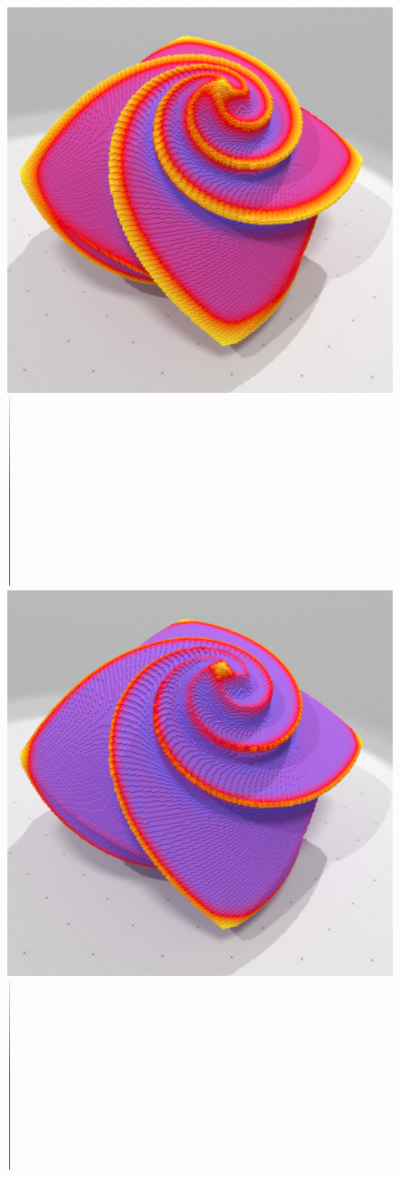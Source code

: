 \begin{figure}[ht]
\begin{center}
  \includegraphics[width=.40\linewidth]{images/Curvature/Octa256_Mean_R_15_0001}
  \includegraphics[width=0.1cm,height=5.5cm]{images/YMTB6W}
  \includegraphics[width=.40\linewidth]{images/Curvature/Octa256_Gauss_R_15_0001}
  \includegraphics[width=0.1cm,height=5.5cm]{images/YMTB6W}\\

\end{center}
\end{figure}
